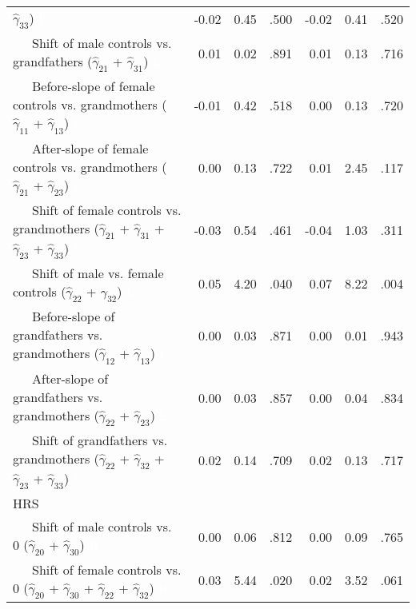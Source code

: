 \documentclass[
  english,
  man, noextraspace]{apa7}
\newenvironment{lltable}{\begin{landscape}\begin{center}\begin{ThreePartTable}}{\end{ThreePartTable}\end{center}\end{landscape}}
\begin{document}
\begin{lltable}
{\begin{longtable}{lrrrrrr}
                              $\hat{\gamma}_{33}$) \textcolor{white}{L} & -0.02 & 0.45 & .500 & -0.02 & 0.41 & .520\\
\ \ \ Shift of male controls vs. grandfathers 
                              ($\hat{\gamma}_{21}$ + $\hat{\gamma}_{31}$) \textcolor{white}{L} & 0.01 & 0.02 & .891 & 0.01 & 0.13 & .716\\
\ \ \ Before-slope of female controls vs. grandmothers 
                              ($\hat{\gamma}_{11}$ + $\hat{\gamma}_{13}$) \textcolor{white}{L} & -0.01 & 0.42 & .518 & 0.00 & 0.13 & .720\\
\ \ \ After-slope of female controls vs. grandmothers 
                              ($\hat{\gamma}_{21}$ + $\hat{\gamma}_{23}$) \textcolor{white}{L} & 0.00 & 0.13 & .722 & 0.01 & 2.45 & .117\\
\ \ \ Shift of female controls vs. grandmothers 
                              ($\hat{\gamma}_{21}$ + $\hat{\gamma}_{31}$ + 
                              $\hat{\gamma}_{23}$ + $\hat{\gamma}_{33}$) \textcolor{white}{L} & -0.03 & 0.54 & .461 & -0.04 & 1.03 & .311\\
\ \ \ Shift of male vs. female controls 
                              ($\hat{\gamma}_{22}$ + $\hat{\gamma}_{32}$) \textcolor{white}{L} & 0.05 & 4.20 & .040 & 0.07 & 8.22 & .004\\
\ \ \ Before-slope of grandfathers vs. grandmothers 
                              ($\hat{\gamma}_{12}$ + $\hat{\gamma}_{13}$) \textcolor{white}{L} & 0.00 & 0.03 & .871 & 0.00 & 0.01 & .943\\
\ \ \ After-slope of grandfathers vs. grandmothers 
                              ($\hat{\gamma}_{22}$ + $\hat{\gamma}_{23}$) \textcolor{white}{L} & 0.00 & 0.03 & .857 & 0.00 & 0.04 & .834\\
\ \ \ Shift of grandfathers vs. grandmothers 
                              ($\hat{\gamma}_{22}$ + $\hat{\gamma}_{32}$ + 
                              $\hat{\gamma}_{23}$ + $\hat{\gamma}_{33}$) \textcolor{white}{L} & 0.02 & 0.14 & .709 & 0.02 & 0.13 & .717\\
HRS &  &  &  &  &  & \\
\ \ \ Shift of male controls vs. 0 ($\hat{\gamma}_{20}$ + 
                              $\hat{\gamma}_{30}$) \textcolor{white}{H} & 0.00 & 0.06 & .812 & 0.00 & 0.09 & .765\\
\ \ \ Shift of female controls vs. 0 ($\hat{\gamma}_{20}$ + 
                              $\hat{\gamma}_{30}$ + $\hat{\gamma}_{22}$ + 
                              $\hat{\gamma}_{32}$) \textcolor{white}{H} & 0.03 & 5.44 & .020 & 0.02 & 3.52 & .061\\

\end{longtable}}
\end{lltable}
\end{document}
